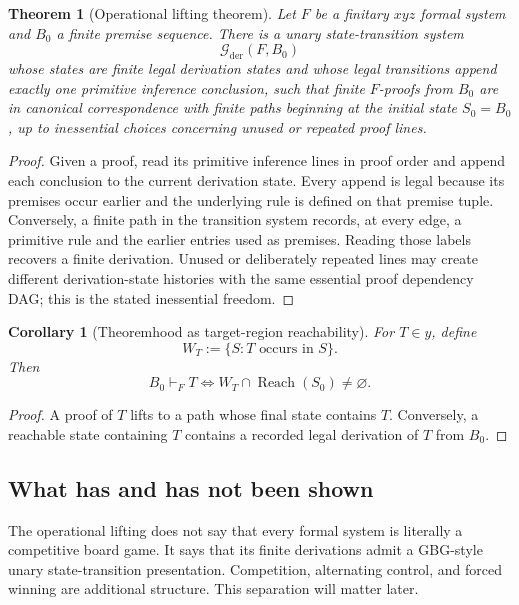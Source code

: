 \documentclass[11pt]{article}
\newtheorem{theorem}[definition]{Theorem}
\newtheorem{corollary}[definition]{Corollary}
\theoremstyle{remark}
\newcommand{\Reach}{\operatorname{Reach}}
\newcommand{\calG}{\mathcal G}
\begin{document}
\begin{theorem}[Operational lifting theorem]
Let $F$ be a finitary $xyz$ formal system and $B_0$ a finite premise sequence. There is a unary state-transition system
\[
\calG_{\mathrm{der}}(F,B_0)
\]
whose states are finite legal derivation states and whose legal transitions append exactly one primitive inference conclusion, such that finite $F$-proofs from $B_0$ are in canonical correspondence with finite paths beginning at the initial state $S_0=B_0$, up to inessential choices concerning unused or repeated proof lines.
\end{theorem}

\begin{proof}
Given a proof, read its primitive inference lines in proof order and append each conclusion to the current derivation state. Every append is legal because its premises occur earlier and the underlying rule is defined on that premise tuple. Conversely, a finite path in the transition system records, at every edge, a primitive rule and the earlier entries used as premises. Reading those labels recovers a finite derivation. Unused or deliberately repeated lines may create different derivation-state histories with the same essential proof dependency DAG; this is the stated inessential freedom.
\end{proof}

\begin{corollary}[Theoremhood as target-region reachability]
For $T\in y$, define
\[
W_T:=\{S:T\text{ occurs in }S\}.
\]
Then
\[
B_0\vdash_F T
\iff
W_T\cap\Reach(S_0)\ne\varnothing.
\]
\end{corollary}

\begin{proof}
A proof of $T$ lifts to a path whose final state contains $T$. Conversely, a reachable state containing $T$ contains a recorded legal derivation of $T$ from $B_0$.
\end{proof}

\subsection{What has and has not been shown}

The operational lifting does not say that every formal system is literally a competitive board game. It says that its finite derivations admit a GBG-style unary state-transition presentation. Competition, alternating control, and forced winning are additional structure. This separation will matter later.
\end{document}
